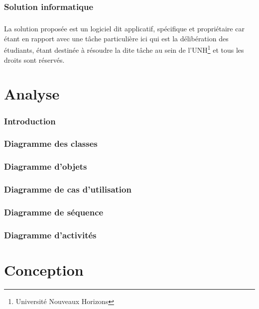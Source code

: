\documentclass[12pt, a4paper]{report}
\begin{document}
   	\subsection{Solution informatique}\label{subsec:solution-informatique}
    \paragraph{}
    La solution proposée est un logiciel dit applicatif, spécifique et propriétaire
    car étant en rapport avec une tâche
    particulière ici qui est la délibération des étudiants, 
    étant destinée à résoudre la dite tâche au sein de l'UNH\footnote{Université Nouveaux Horizons} et
    tous les droits sont réservés.

   	\chapter{Analyse}\label{cha:analyse}
    \subsection{Introduction}\label{subsec:introduction}
    \subsection{Diagramme des classes}\label{subsec:diagramme-des-classes-de-l-application}
    \subsection{Diagramme d'objets}\label{subsec:diagramme-des-objets-de-l-application}
    \subsection{Diagramme de cas d’utilisation}\label{subsec:diagramme-de-cas-d-utilisation}
   	\subsection{Diagramme de séquence}\label{subsec:diagramme-de-sequence}
    \subsection{Diagramme d’activités}\label{subsec:diagramme-d-activites}
    
    \chapter{Conception}\label{sec:conception}
\end{document}

